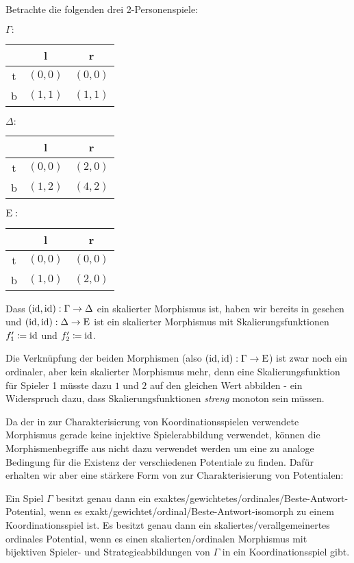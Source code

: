 \begin{bsp}\label{bsp:GegenbspKompositionSkMorphismen}
	Betrachte die folgenden drei 2-Personenspiele:
	\begin{center}
		$\Gamma:$ \quad
		\begin{tabular}{c||c|c}
			& l 		& r 		\\\hline\hline
			t	& $(0,0)$	& $(0,0)$	\\\hline
			b	& $(1,1)$	& $(1,1)$ 
		\end{tabular}\hspace{3em}
		$\Delta:$ \quad
		\begin{tabular}{c||c|c}
			& l 		& r 		\\\hline\hline
		t	& $(0,0)$	& $(2,0)$	\\\hline
		b	& $(1,2)$	& $(4,2)$ 
		\end{tabular}\hspace{3em}
		$\mathrm{E}:$ \quad
		\begin{tabular}{c||c|c}
			& l 		& r 		\\\hline\hline
			t	& $(0,0)$	& $(0,0)$	\\\hline
			b	& $(1,0)$	& $(2,0)$ 
		\end{tabular}
	\end{center}
	Dass $(\mathrm{id}, \mathrm{id}): \Gamma \to \Delta$ ein skalierter Morphismus ist, haben wir bereits in  gesehen und $(\mathrm{id}, \mathrm{id}): \Delta \to \mathrm{E}$ ist ein skalierter Morphismus mit Skalierungsfunktionen $f'_1 \coloneqq \mathrm{id}$ und $f'_2 \coloneqq \mathrm{id}$. 
	
	Die Verknüpfung der beiden Morphismen (also $(\mathrm{id}, \mathrm{id}): \Gamma \to \mathrm{E}$) ist zwar noch ein ordinaler, aber kein skalierter Morphismus mehr, denn eine Skalierungsfunktion für Spieler 1 müsste dazu $1$ und $2$ auf den gleichen Wert abbilden - ein Widerspruch dazu, dass Skalierungsfunktionen \emph{streng} monoton sein müssen.
\end{bsp}


Da der in  zur Charakterisierung von Koordinationsspielen verwendete Morphismus gerade keine injektive Spielerabbildung verwendet, können die Morphismenbegriffe aus  nicht dazu verwendet werden um eine zu  analoge Bedingung für die Existenz der verschiedenen Potentiale zu finden. Dafür erhalten wir aber eine stärkere Form von  zur Charakterisierung von Potentialen:

\begin{prop}\label{prop:CharPotentialeDurchIsos}
	Ein Spiel $\Gamma$ besitzt genau dann ein exaktes/gewichtetes/ordinales/Beste-Antwort-Potential, wenn es exakt/gewichtet/ordinal/Beste-Antwort-isomorph zu einem Koordinationsspiel ist. Es besitzt genau dann ein skaliertes/verallgemeinertes ordinales Potential, wenn es einen skalierten/ordinalen Morphismus mit bijektiven Spieler- und Strategieabbildungen von $\Gamma$ in ein Koordinationsspiel gibt.
\end{prop}

